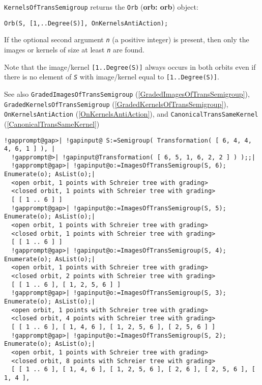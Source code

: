 \documentclass[a4paper,11pt]{report}
\begin{document}
{{{ \texttt{KernelsOfTransSemigroup} returns the \texttt{Orb} (\textbf{orb: orb}) object: 
\begin{Verbatim}[commandchars=!@|,fontsize=\small,frame=single,label=Example]
  Orb(S, [1,..Degree(S)], OnKernelsAntiAction);
\end{Verbatim}
 

 If the optional second argument \mbox{\texttt{\mdseries\slshape n}} (a positive integer) is present, then only the images or kernels of size at
least \mbox{\texttt{\mdseries\slshape n}} are found.

 Note that the image/kernel \texttt{[1..Degree(S)]} always occurs in both orbits even if there is no element of \mbox{\texttt{\mdseries\slshape S}} with image/kernel equal to \texttt{[1..Degree(S)]}.

 See also \texttt{GradedImagesOfTransSemigroup} (\ref{GradedImagesOfTransSemigroup}), \texttt{GradedKernelsOfTransSemigroup} (\ref{GradedKernelsOfTransSemigroup}), \texttt{OnKernelsAntiAction} (\ref{OnKernelsAntiAction}), and \texttt{CanonicalTransSameKernel} (\ref{CanonicalTransSameKernel}) 
\begin{Verbatim}[commandchars=!@|,fontsize=\small,frame=single,label=Example]
  !gapprompt@gap>| !gapinput@ S:=Semigroup( Transformation( [ 6, 4, 4, 4, 6, 1 ] ), |
  !gapprompt@>| !gapinput@Transformation( [ 6, 5, 1, 6, 2, 2 ] ) );;|
  !gapprompt@gap>| !gapinput@o:=ImagesOfTransSemigroup(S, 6); Enumerate(o); AsList(o);|
  <open orbit, 1 points with Schreier tree with grading>
  <closed orbit, 1 points with Schreier tree with grading>
  [ [ 1 .. 6 ] ]
  !gapprompt@gap>| !gapinput@o:=ImagesOfTransSemigroup(S, 5); Enumerate(o); AsList(o);|
  <open orbit, 1 points with Schreier tree with grading>
  <closed orbit, 1 points with Schreier tree with grading>
  [ [ 1 .. 6 ] ]
  !gapprompt@gap>| !gapinput@o:=ImagesOfTransSemigroup(S, 4); Enumerate(o); AsList(o);|
  <open orbit, 1 points with Schreier tree with grading>
  <closed orbit, 2 points with Schreier tree with grading>
  [ [ 1 .. 6 ], [ 1, 2, 5, 6 ] ]
  !gapprompt@gap>| !gapinput@o:=ImagesOfTransSemigroup(S, 3); Enumerate(o); AsList(o);|
  <open orbit, 1 points with Schreier tree with grading>
  <closed orbit, 4 points with Schreier tree with grading>
  [ [ 1 .. 6 ], [ 1, 4, 6 ], [ 1, 2, 5, 6 ], [ 2, 5, 6 ] ]
  !gapprompt@gap>| !gapinput@o:=ImagesOfTransSemigroup(S, 2); Enumerate(o); AsList(o);|
  <open orbit, 1 points with Schreier tree with grading>
  <closed orbit, 8 points with Schreier tree with grading>
  [ [ 1 .. 6 ], [ 1, 4, 6 ], [ 1, 2, 5, 6 ], [ 2, 6 ], [ 2, 5, 6 ], [ 1, 4 ],

\end{Verbatim}}}}
\end{document}
